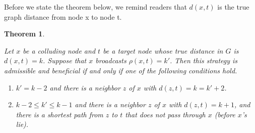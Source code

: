 \documentclass[reprint]{revtex4-1}
\newtheorem{theorem}{Theorem}[section]
\begin{document}
Before we state the theorem below, we remind readers that $d(x,t)$ is the true graph distance from node x to node t.
\begin{theorem} \label{thm:single-agent}

Let $x$ be a colluding node and $t$ be a target node whose true distance in $G$
is $d(x,t) = k$. Suppose that $x$ broadcasts $\rho(x,t) = k'$. Then this
strategy is admissible and beneficial if and only if one of the following
conditions hold.

\begin{enumerate}
   \item $k' = k - 2$ and there is a neighbor $z$ of $x$ with $d(z,t) = k = k'
+ 2$.
   \item $k-2 \leq k' \leq k-1$ and there is a neighbor $z$ of $x$ with $d(z,t)
= k + 1$, and there is a shortest path from $z$ to $t$ that does not pass
through $x$ (before $x$'s lie).
\end{enumerate}

\end{theorem}
\end{document}
